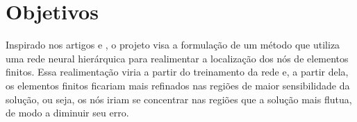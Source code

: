 \section{Objetivos}

Inspirado nos artigos  e , o projeto visa a formulação de um método que utiliza uma rede neural hierárquica para realimentar a localização dos nós de elementos finitos. 
Essa realimentação viria a partir do treinamento da rede e, a partir dela, os elementos finitos ficariam mais refinados nas regiões de maior sensibilidade da solução, ou seja, os nós iriam se concentrar nas regiões que a solução mais flutua, de modo a diminuir seu erro.